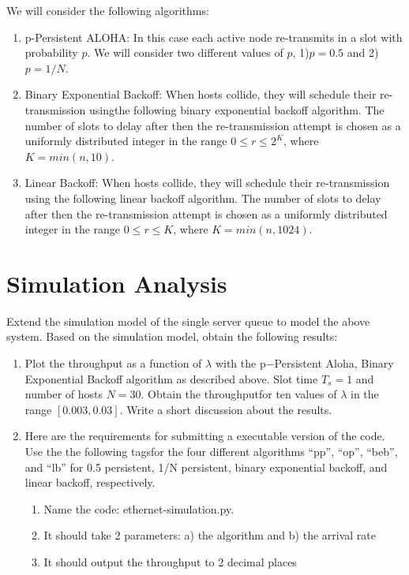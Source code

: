 \documentclass{article}
\begin{document}
We will consider the following algorithms:

\begin{enumerate}
    \item p-Persistent ALOHA: In this case each active node re-transmits in a slot with probability $p$.
          We will consider two different values of $p$, 1)$p= 0.5$ and 2)$p=1/N$.
    \item Binary Exponential Backoff: When hosts collide, they will schedule their re-transmission usingthe following binary exponential backoff algorithm.
          The number of slots to delay after then the re-transmission attempt is chosen as a uniformly distributed integer in the range $0 \le r \le 2^K$, where $K= min(n,10)$.
    \item Linear Backoff: When hosts collide, they will schedule their re-transmission using the following linear backoff algorithm.
          The number of slots to delay after then the re-transmission attempt is chosen as a uniformly distributed integer in the range $0 \le r \le K$, where $K= min(n,1024)$.
\end{enumerate}

\section{Simulation Analysis}
Extend the simulation model of the single server queue to model the above system.
Based on the simulation model, obtain the following results:

\begin{enumerate}
    \item Plot  the  throughput  as  a  function  of $\lambda$ with  the p−Persistent  Aloha,  Binary  Exponential  Backoff algorithm as described above.
          Slot time $T_s= 1$ and number of hosts $N = 30$.
          Obtain the throughputfor ten values of $\lambda$ in the range $[0.003, 0.03]$.
          Write a short discussion about the results.
    \item Here are the requirements for submitting a executable version of the code.
          Use the the following tagsfor the four different algorithms ``pp'', ``op'', ``beb'', and ``lb'' for 0.5 persistent, 1/N persistent, binary exponential backoff, and linear backoff, respectively.
          \begin{enumerate}
              \item Name the code: ethernet-simulation.py.
              \item It should take 2 parameters: a) the algorithm and b) the arrival rate
              \item It should output the throughput to 2 decimal places
          \end{enumerate}

\end{enumerate}
\end{document}
